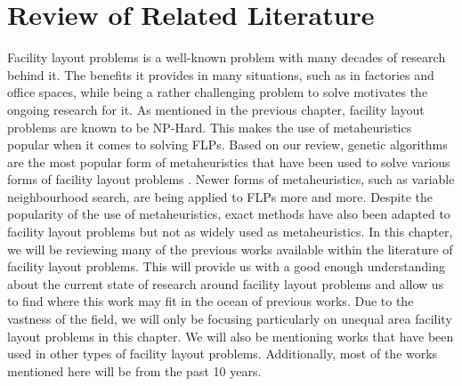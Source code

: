 \chapter{Review of Related Literature} \label{sec:rrl-title}
Facility layout problems is a well-known problem with many decades of research behind it. The benefits it provides in many situations, such as in factories and office spaces, while being a rather challenging problem to solve motivates the ongoing research for it. As mentioned in the previous chapter, facility layout problems are known to be NP-Hard. This makes the use of metaheuristics popular when it comes to solving FLPs. Based on our review, genetic algorithms are the most popular form of metaheuristics that have been used to solve various forms of facility layout problems  \cite{Hosseini-Nasab2018}. Newer forms of metaheuristics, such as variable neighbourhood search, are being applied to FLPs more and more. Despite the popularity of the use of metaheuristics, exact methods have also been adapted to facility layout problems but not as widely used as metaheuristics. In this chapter, we will be reviewing many of the previous works available within the literature of facility layout problems. This will provide us with a good enough understanding about the current state of research around facility layout problems and allow us to find where this work may fit in the ocean of previous works. Due to the vastness of the field, we will only be focusing particularly on unequal area facility layout problems in this chapter. We will also be mentioning works that have been used in other types of facility layout problems. Additionally, most of the works mentioned here will be from the past 10 years.




